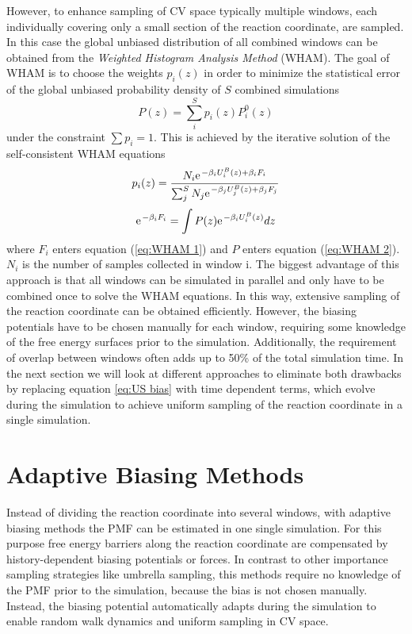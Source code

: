 However, to enhance sampling of CV space typically multiple windows, each individually covering only a small section of the reaction coordinate, are sampled. In this case the global unbiased distribution of all combined windows can be obtained from the \textit{Weighted Histogram Analysis Method} (WHAM).\autocite{souaille2001extension} The goal of WHAM is to choose the weights $p_i(z)$ in order to minimize the statistical error of the global unbiased probability density of $S$ combined simulations
\begin{equation}
  P(z)=\sum_i^{S} p_i(z) P_i^0(z)
\end{equation}
under the constraint $\sum p_i = 1$. This is achieved by the iterative solution of the self-consistent WHAM equations
\begin{equation}
  p_i(z) = \frac{N_i \e^{-\beta_i U_i^B(z)+\beta_i F_i}}{\sum_j^S N_j \e^{-\beta_j U_j^B(z)+\beta_j F_j}} \label{eq:WHAM 1}
\end{equation}
\begin{equation}
  \e^{-\beta_i F_i} = \int P(z)\e^{-\beta_i U_i^B (z)}dz
  \label{eq:WHAM 2}
\end{equation}
where $F_i$ enters equation (\ref{eq:WHAM 1}) and $P$ enters equation (\ref{eq:WHAM 2}).\autocite{kastner2011umbrella,souaille2001extension} $N_i$ is the number of samples collected in window i.
The biggest advantage of this approach is that all windows can be simulated in parallel and only have to be combined once to solve the WHAM equations. In this way, extensive sampling of the reaction coordinate can be obtained efficiently.
However, the biasing potentials have to be chosen manually for each window, requiring some knowledge of the free energy surfaces prior to the simulation.
Additionally, the requirement of overlap between windows often adds up to 50\% of the total simulation time.\autocite{comer2015adaptive}
In the next section we will look at different approaches to eliminate both drawbacks by replacing equation \ref{eq:US bias} with time dependent terms, which evolve during the simulation to achieve uniform sampling of the reaction coordinate in a single simulation.

\newpage
\section{Adaptive Biasing Methods}
\label{sec:adaptive biasing}

Instead of dividing the reaction coordinate into several windows, with adaptive biasing methods the PMF can be estimated in one single simulation. For this purpose free energy barriers along the reaction coordinate are compensated by history-dependent biasing potentials or forces. In contrast to other importance sampling strategies like umbrella sampling, this methods require no knowledge of the PMF prior to the simulation, because the bias is not chosen manually. Instead, the biasing potential automatically adapts during the simulation to enable random walk dynamics and uniform sampling in CV space.\autocite{comer2015adaptive, barducci2011metadynamics}

